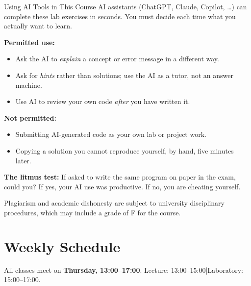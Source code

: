 \documentclass[11pt,a4paper]{article}
\begin{document}
\begin{infobox}{Using AI Tools in This Course}
AI assistants (ChatGPT, Claude, Copilot, \ldots) can complete these lab exercises
in seconds. You must decide each time what you actually want to learn.

\smallskip
\textbf{Permitted use:}
\begin{itemize}[nosep, leftmargin=*]
  \item Ask the AI to \emph{explain} a concept or error message in a different way.
  \item Ask for \emph{hints} rather than solutions; use the AI as a tutor, not an
        answer machine.
  \item Use AI to review your own code \emph{after} you have written it.
\end{itemize}

\smallskip
\textbf{Not permitted:}
\begin{itemize}[nosep, leftmargin=*]
  \item Submitting AI-generated code as your own lab or project work.
  \item Copying a solution you cannot reproduce yourself, by hand, five minutes later.
\end{itemize}

\smallskip
\textbf{The litmus test:} If asked to write the same program on paper in the exam,
could you? If yes, your AI use was productive. If no, you are cheating yourself.
\end{infobox}

Plagiarism and academic dishonesty are subject to university disciplinary
procedures, which may include a grade of F for the course.

\section{Weekly Schedule}

\noindent All classes meet on \textbf{Thursday, 13:00--17:00}.
Lecture: 13:00--15:00\quad|\quad Laboratory: 15:00--17:00.

\vspace{8pt}

\setlength{\tabcolsep}{5pt}
\renewcommand{\arraystretch}{1.4}
\end{document}
